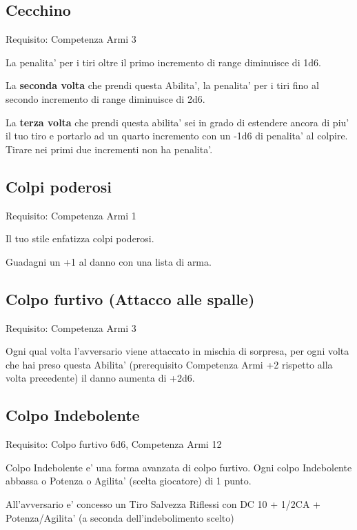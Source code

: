 \documentclass[a4paper,11pt,twoside,openany]{dndbook}
\begin{document}
\subsection{Cecchino}

Requisito: Competenza Armi 3

La penalita' per i tiri oltre il primo incremento di range diminuisce
di 1d6.

La \textbf{seconda volta} che prendi questa Abilita', la penalita'
per i tiri fino al secondo incremento di range diminuisce di 2d6.

La \textbf{terza volta} che prendi questa abilita' sei in grado di
estendere ancora di piu' il tuo tiro e portarlo ad un quarto incremento
con un -1d6 di penalita' al colpire. Tirare nei primi due incrementi
non ha penalita'.

\subsection{Colpi poderosi}

Requisito: Competenza Armi 1

Il tuo stile enfatizza colpi poderosi.

Guadagni un +1 al danno con una lista di arma.

\subsection{Colpo furtivo (Attacco alle spalle)}

Requisito: Competenza Armi 3

Ogni qual volta l'avversario viene attaccato in mischia di sorpresa,
per ogni volta che hai preso questa Abilita' (prerequisito Competenza
Armi +2 rispetto alla volta precedente) il danno aumenta di +2d6.

\subsection{Colpo Indebolente}

Requisito: Colpo furtivo 6d6, Competenza Armi 12

Colpo Indebolente e' una forma avanzata di colpo furtivo. Ogni colpo
Indebolente abbassa o Potenza o Agilita' (scelta giocatore) di 1 punto.

All'avversario e' concesso un Tiro Salvezza Riflessi con DC 10 + 1/2CA + Potenza/Agilita' (a seconda dell'indebolimento scelto)
\end{document}
